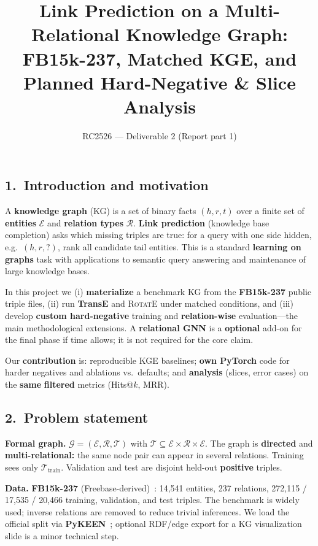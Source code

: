 \documentclass[10pt,a4paper]{article}
\title{Link Prediction on a Multi-Relational Knowledge Graph:\\
FB15k-237, Matched KGE, and Planned Hard-Negative \& Slice Analysis}
\author{\kteam}
\date{RC2526 --- Deliverable 2 (Report part 1)}
\begin{document}
\maketitle
\thispagestyle{empty}
\vspace{-0.5em}
\subsection*{1.\ Introduction and motivation}
A \textbf{knowledge graph} (KG) is a set of binary facts $(h,r,t)$ over a finite set of \textbf{entities} $\mathcal{E}$ and \textbf{relation types} $\mathcal{R}$. \textbf{Link prediction} (knowledge base completion) asks which missing triples are true: for a query with one side hidden, e.g.\ $(h,r,?)$, rank all candidate tail entities. This is a standard \textbf{learning on graphs} task with applications to semantic query answering and maintenance of large knowledge bases.

In this project we (i) \textbf{materialize} a benchmark KG from the \textbf{FB15k-237} public triple files, (ii) run \textbf{TransE} and \textsc{RotatE} under matched conditions, and (iii) develop \textbf{custom hard-negative} training and \textbf{relation-wise} evaluation---the main methodological extensions. A \textbf{relational GNN} is a \textbf{optional} add-on for the final phase if time allows; it is not required for the core claim.

Our \textbf{contribution} is: reproducible KGE baselines; \textbf{own PyTorch} code for harder negatives and ablations vs.\ defaults; and \textbf{analysis} (slices, error cases) on the \textbf{same} \textbf{filtered} metrics (Hits@$k$, MRR).

\subsection*{2.\ Problem statement}
\textbf{Formal graph.} $\mathcal{G}=(\mathcal{E},\mathcal{R},\mathcal{T})$ with $\mathcal{T}\subseteq\mathcal{E}\times\mathcal{R}\times\mathcal{E}$. The graph is \textbf{directed} and \textbf{multi-relational:} the same node pair can appear in several relations. Training sees only $\mathcal{T}_{\mathrm{train}}$. Validation and test are disjoint held-out \textbf{positive} triples.

\textbf{Data.} \textbf{FB15k-237} (Freebase-derived)~\citep{sun2019rotate}: 14,541 entities, 237 relations, 272,115 / 17,535 / 20,466 training, validation, and test triples. The benchmark is widely used; inverse relations are removed to reduce trivial inferences. We load the official split via \textbf{PyKEEN}~\citep{ali2021pykeen}; optional RDF/edge export for a KG visualization slide is a minor technical step.
\end{document}
